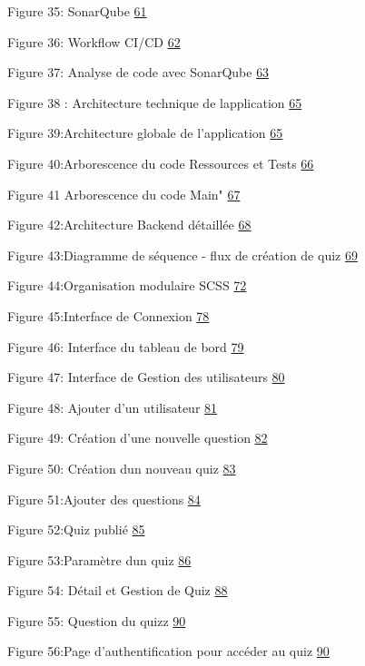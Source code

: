 \documentclass[12pt,a4paper,twoside]{report}
\begin{document}
Figure 35: SonarQube \protect\hyperlink{_Toc203823445}{61}

Figure 36: Workflow CI/CD \protect\hyperlink{_Toc203823446}{62}

Figure 37: Analyse de code avec SonarQube
\protect\hyperlink{_Toc203823447}{63}

Figure 38 : Architecture technique de l\textquotesingle application
\protect\hyperlink{_Toc203823448}{65}

Figure 39:Architecture globale de l'application
\protect\hyperlink{_Toc203823449}{65}

Figure 40:Arborescence du code \textquotesingle Ressources et Tests
\protect\hyperlink{_Toc203823450}{66}

Figure 41 Arborescence du code \textquotesingle Main"
\protect\hyperlink{_Toc203823451}{67}

Figure 42:Architecture Backend détaillée
\protect\hyperlink{_Toc203823452}{68}

Figure 43:Diagramme de séquence - flux de création de quiz
\protect\hyperlink{_Toc203823453}{69}

Figure 44:Organisation modulaire SCSS
\protect\hyperlink{_Toc203823454}{72}

Figure 45:Interface de Connexion \protect\hyperlink{_Toc203823455}{78}

Figure 46: Interface du tableau de bord
\protect\hyperlink{_Toc203823456}{79}

Figure 47: Interface de Gestion des utilisateurs
\protect\hyperlink{_Toc203823457}{80}

Figure 48: Ajouter d'un utilisateur
\protect\hyperlink{_Toc203823458}{81}

Figure 49: Création d'une nouvelle question
\protect\hyperlink{_Toc203823459}{82}

Figure 50: Création d\textquotesingle un nouveau quiz
\protect\hyperlink{_Toc203823460}{83}

Figure 51:Ajouter des questions \protect\hyperlink{_Toc203823461}{84}

Figure 52:Quiz publié \protect\hyperlink{_Toc203823462}{85}

Figure 53:Paramètre d\textquotesingle un quiz
\protect\hyperlink{_Toc203823463}{86}

Figure 54: Détail et Gestion de Quiz
\protect\hyperlink{_Toc203823464}{88}

Figure 55: Question du quizz \protect\hyperlink{_Toc203823465}{90}

Figure 56:Page d'authentification pour accéder au quiz
\protect\hyperlink{_Toc203823466}{90}
\end{document}
